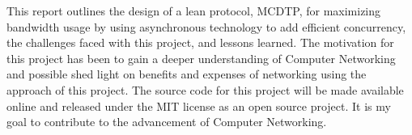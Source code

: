 This report outlines the design of a lean protocol, MCDTP, for maximizing bandwidth usage by using asynchronous technology to add efficient concurrency, the challenges faced with this project, and lessons learned. The motivation for this project has been to gain a deeper understanding of Computer Networking and possible shed light on benefits and expenses of networking using the approach of this project. The source code for this project will be made available online and released under the MIT license as an open source project. It is my goal to contribute to the advancement of Computer Networking.
